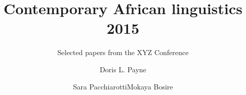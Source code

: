 
\title{Contemporary African linguistics 2015} 
\subtitle{Selected papers from the XYZ Conference}
\author{Doris L. Payne\and\newlineCover Sara Pacchiarotti\lastand\newlineCover Mokaya Bosire} %

\renewcommand{\lsISBN}{978-0-000000-00-0}                      
\renewcommand{\lsSeries}{calseries}
\renewcommand{\lsSeriesNumber}{2} 
\renewcommand{\lsURL}{http://langsci-press.org/catalog/book/00} %